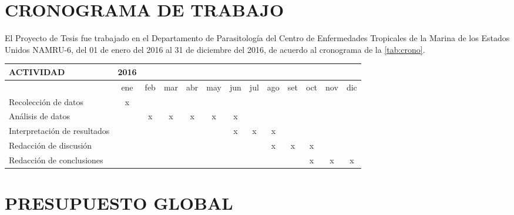 \documentclass[a4paper]{article}
\begin{document}
\section{CRONOGRAMA DE TRABAJO}\label{cronograma-de-trabajo}

El Proyecto de Tesis fue trabajado en el Departamento de Parasitología
del Centro de Enfermedades Tropicales de la Marina de los Estados Unidos
NAMRU-6, del 01 de enero del 2016 al 31 de diciembre del 2016, de
acuerdo al cronograma de la \autoref{tab:crono}.

\begin{table}[ht]
        \label{tab:crono}
        \vspace{2mm}
\begin{center}
\begin{tabular}{lcccccccccccc}
  \hline
  \textbf{ACTIVIDAD} & 
  \textbf{2016} & & & & & & & & & & &\\
  \hline
  & 
  ene & feb & mar & abr & may & jun & jul & ago & set & oct & nov & dic\\
  \cline{2-13}
  Recolección de datos & 
  x & & & & & & & & & & &\\
  \cline{2-13}
  Análisis de datos & 
  & x & x & x & x & x & & & & & &\\
  \cline{2-13}
  Interpretación de resultados & 
  & & & & & x & x & x & & & &\\
  \cline{2-13}
  Redacción de discusión & 
  & & & & & & & x & x & x & &\\
  \cline{2-13}
  Redacción de conclusiones & 
  & & & & & & & & & x & x & x\\
  \hline
\end{tabular}
\end{center}
\end{table}

\section{PRESUPUESTO GLOBAL}\label{presupuesto-global}
\end{document}
